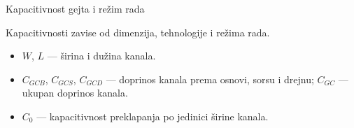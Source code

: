 \begin{frame}[label=09_3-s004]{Kapacitivnost gejta i režim rada}
\begin{center}

\end{center}Kapacitivnosti zavise od dimenzija, tehnologije i režima rada.
\begin{itemize}
\item $W$, $L$ — širina i dužina kanala.
\item $C_{GCB}$, $C_{GCS}$, $C_{GCD}$ — doprinos kanala prema osnovi, sorsu i drejnu; $C_{GC}$ — ukupan doprinos kanala.
\item $C_0$ — kapacitivnost preklapanja po jedinici širine kanala.
\end{itemize}
\end{frame}
